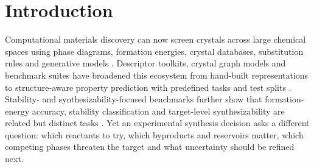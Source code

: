 \documentclass[11pt, letterpaper]{article}
\begin{document}
\section*{Introduction}

Computational materials discovery can now screen crystals across large chemical spaces using phase diagrams, formation energies, crystal databases, substitution rules and generative models \cite{hellenbrandt2004icsd,jain2013materialsproject,jain2016computational_predictions,hautier2011ionic_substitutions,merchant2023gnome,zeni2025mattergen}. Descriptor toolkits, crystal graph models and benchmark suites have broadened this ecosystem from hand-built representations to structure-aware property prediction with predefined tasks and test splits \cite{matminer2018,xie2018cgcnn,chen2019megnet,dunn2020matbench}. Stability- and synthesizability-focused benchmarks further show that formation-energy accuracy, stability classification and target-level synthesizability are related but distinct tasks \cite{bartel2020critical_stability,jang2020structure_synthesizability,davariashtiyani2021synthesizability,riebesell2025matbench_discovery}. Yet an experimental synthesis decision asks a different question: which reactants to try, which byproducts and reservoirs matter, which competing phases threaten the target and what uncertainty should be refined next.
\end{document}
